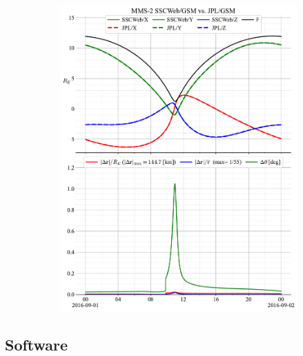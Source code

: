 \documentclass[draft]{agujournal2019}
\begin{document}
\begin{figure}[h]
\begin{subfigure}[b]{0.49\textwidth}
         \includegraphics[width=\textwidth]{code/figures/ephemeris/MMS-2_SSCWeb-GSM_vs_JPL-GSM.pdf}
     \end{subfigure}
     \caption{}
     \label{fig:mms-2}
\end{figure}

\clearpage




\subsection{Software}
\label{sect:comparisons_software}
\end{document}
